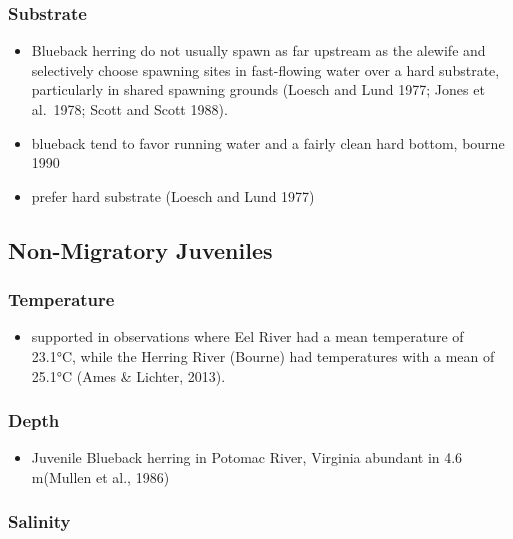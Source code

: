 \documentclass[
]{book}
\providecommand{\tightlist}{%
  \setlength{\itemsep}{0pt}\setlength{\parskip}{0pt}}
\begin{document}
\hypertarget{substrate-6}{%
\subsubsection{Substrate}\label{substrate-6}}

\begin{itemize}
\item
  Blueback herring do not usually spawn as far upstream as the alewife and selectively choose spawning sites in fast-flowing water over a hard substrate, particularly in shared spawning grounds (Loesch and Lund 1977; Jones et al.~1978; Scott and Scott 1988).
\item
  blueback tend to favor running water and a fairly clean hard bottom, bourne 1990
\item
  prefer hard substrate (Loesch and Lund 1977)
\end{itemize}

\hypertarget{non-migratory-juveniles-2}{%
\subsection{Non-Migratory Juveniles}\label{non-migratory-juveniles-2}}

\hypertarget{temperature-7}{%
\subsubsection{Temperature}\label{temperature-7}}

\begin{itemize}
\tightlist
\item
  supported in observations where Eel River had a mean temperature of 23.1°C, while the Herring River (Bourne) had temperatures with a mean of 25.1°C (Ames \& Lichter, 2013).
\end{itemize}

\hypertarget{depth-7}{%
\subsubsection{Depth}\label{depth-7}}

\begin{itemize}
\tightlist
\item
  Juvenile Blueback herring in Potomac River, Virginia abundant in 4.6 m(Mullen et al., 1986)
\end{itemize}

\hypertarget{salinity-7}{%
\subsubsection{Salinity}\label{salinity-7}}
\end{document}
